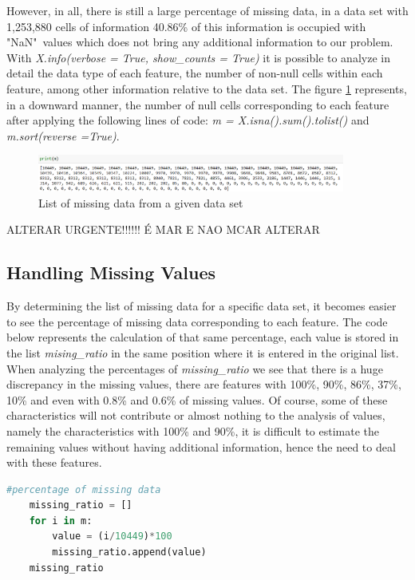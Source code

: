However, in all, there is still a large percentage of missing data, in a data set with 1,253,880 cells of information 40.86\% of this information is occupied with "NaN"\ values which does not bring any additional information to our problem. With \textit{X.info(verbose = True, show\_counts = True)} it is possible to analyze in detail the data type of each feature, the number of non-null cells within each feature, among other information relative to the data set. The figure \ref{fig:missing_values} represents, in a downward manner, the number of null cells corresponding to each feature after applying the following lines of code: \textit{m = X.isna().sum().tolist()} and \textit{m.sort(reverse =True)}. 

\begin{figure}[h]
    \centering
    \includegraphics[width=0.9\textwidth,height=0.1\textheight]{Chapters/Figures/missing_values.png}
    \caption{List of missing data from a given data set}
    \label{fig:missing_values}
\end{figure}


ALTERAR URGENTE!!!!!! É MAR E NAO MCAR ALTERAR



\subsection{Handling Missing Values} %
\label{sec:document_structure}
\hspace{10px}By determining the list of missing data for a specific data set, it becomes easier to see the percentage of missing data corresponding to each feature. The code below represents the calculation of that same percentage, each value is stored in the list \textit{mising\_ratio} in the same position where it is entered in the original list. When analyzing the percentages of \textit{missing\_ratio} we see that there is a huge discrepancy in the missing values, there are features with 100\%, 90\%, 86\%, 37\%, 10\% and even with 0.8\% and 0.6\% of missing values. Of course, some of these characteristics will not contribute or almost nothing to the analysis of values, namely the characteristics with 100\% and 90\%, it is difficult to estimate the remaining values without having additional information, hence the need to deal with these features.
\begin{lstlisting}[language=Python]
#percentage of missing data 
    missing_ratio = []
    for i in m:
        value = (i/10449)*100
        missing_ratio.append(value)
    missing_ratio
\end{lstlisting}

